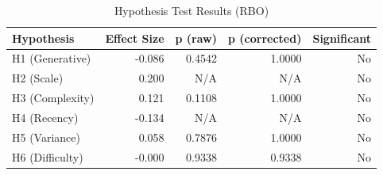 \begin{table}
\caption{Hypothesis Test Results (RBO)}
\label{tab:results_rbo}
\begin{tabular}{lrrrr}
\toprule
Hypothesis & Effect Size & p (raw) & p (corrected) & Significant \\
\midrule
H1 (Generative) & -0.086 & 0.4542 & 1.0000 & No \\
H2 (Scale) & 0.200 & N/A & N/A & No \\
H3 (Complexity) & 0.121 & 0.1108 & 1.0000 & No \\
H4 (Recency) & -0.134 & N/A & N/A & No \\
H5 (Variance) & 0.058 & 0.7876 & 1.0000 & No \\
H6 (Difficulty) & -0.000 & 0.9338 & 0.9338 & No \\
\bottomrule
\end{tabular}
\end{table}
